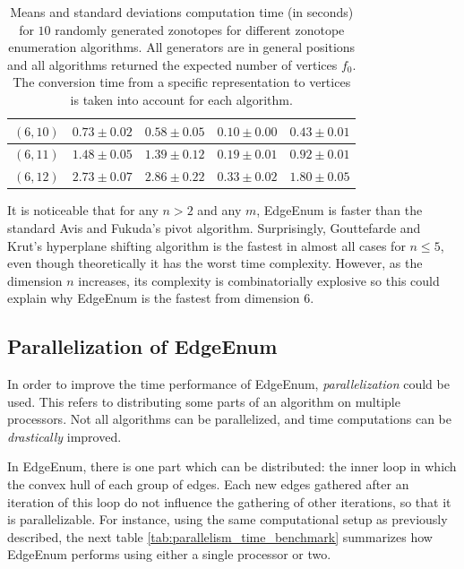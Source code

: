 \begin{table}[!ht]
\begin{tabular}{|c|c|c|c|c|}
    $(6, 10)$ & $0.73\pm 0.02$ & $0.58\pm 0.05$ & $\mathbf{0.10\pm 0.00}$ & $0.43\pm 0.01$ \\
    \hline
    $(6, 11)$ & $1.48\pm 0.05$ & $1.39\pm 0.12$ & $\mathbf{0.19\pm 0.01}$ & $0.92\pm 0.01$ \\
    \hline
    $(6, 12)$ & $2.73\pm 0.07$ & $2.86\pm 0.22$ & $\mathbf{0.33\pm 0.02}$ & $1.80\pm 0.05$ \\
    \hline
    \end{tabular}
    \caption{Means and standard deviations computation time (in seconds) for $10$ randomly generated zonotopes for different zonotope enumeration algorithms. All generators are in general positions and all algorithms returned the expected number of vertices $f_0$. The conversion time from a specific representation to vertices is taken into account for each algorithm.}
    \label{tab:benchmark_time}
\end{table}

It is noticeable that for any $n>2$ and any $m$, EdgeEnum is faster than the standard Avis and Fukuda's pivot algorithm. Surprisingly, Gouttefarde and Krut's hyperplane shifting algorithm is the fastest in almost all cases for $n\leq 5$, even though theoretically it has the worst time complexity. However, as the dimension $n$ increases, its complexity is combinatorially explosive so this could explain why EdgeEnum is the fastest from dimension $6$.

\subsection{Parallelization of EdgeEnum}
In order to improve the time performance of EdgeEnum, \emph{parallelization} could be used. This refers to distributing some parts of an algorithm on multiple processors. Not all algorithms can be parallelized, and time computations can be \emph{drastically} improved.

In EdgeEnum, there is one part which can be distributed: the inner loop in which the convex hull of each group of edges. Each new edges gathered after an iteration of this loop do not influence the gathering of other iterations, so that it is parallelizable. For instance, using the same computational setup as previously described, the next table \ref{tab:parallelism_time_benchmark} summarizes how EdgeEnum performs using either a single processor or two. 

